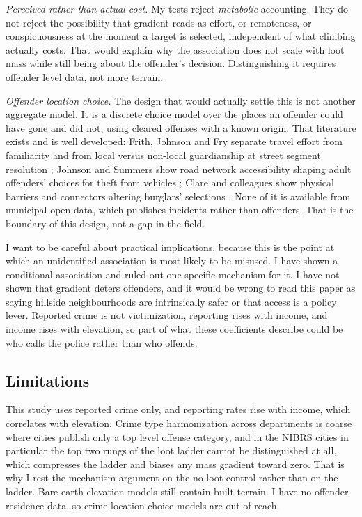 \documentclass[11pt,letterpaper]{article}
\begin{document}
\emph{Perceived rather than actual cost.} My tests reject \emph{metabolic}
accounting. They do not reject the possibility that gradient reads as effort, or
remoteness, or conspicuousness at the moment a target is selected, independent of what
climbing actually costs. That would explain why the association does not scale with loot
mass while still being about the offender's decision. Distinguishing it requires
offender level data, not more terrain.

\emph{Offender location choice.} The design that would actually settle this is not
another aggregate model. It is a discrete choice model over the places an offender
could have gone and did not, using cleared offenses with a known origin. That
literature exists and is well developed: Frith, Johnson and Fry separate travel effort
from familiarity and from local versus non-local guardianship at street segment
resolution \cite{frith2017}; Johnson and Summers show road network accessibility
shaping adult offenders' choices for theft from vehicles \cite{johnsonsummers2015};
Clare and colleagues show physical barriers and connectors altering burglars'
selections \cite{clare2009}. None of it is available from municipal open data, which
publishes incidents rather than offenders. That is the boundary of this design, not a
gap in the field.

I want to be careful about practical implications, because this is the point at which
an unidentified association is most likely to be misused. I have shown a conditional
association and ruled out one specific mechanism for it. I have not shown that
gradient deters offenders, and it would be wrong to read this paper as saying hillside
neighbourhoods are intrinsically safer or that access is a policy lever. Reported
crime is not victimization, reporting rises with income, and income rises with
elevation, so part of what these coefficients describe could be who calls the police
rather than who offends.

\subsection{Limitations}

This study uses reported crime only, and reporting rates rise with income, which
correlates with elevation. Crime type harmonization across departments is coarse where
cities publish only a top level offense category, and in the NIBRS cities in
particular the top two rungs of the loot ladder cannot be distinguished at all, which
compresses the ladder and biases any mass gradient toward zero. That is why I rest the
mechanism argument on the no-loot control rather than on the ladder. Bare earth
elevation models still contain built terrain. I have no offender residence data, so
crime location choice models are out of reach.
\end{document}
